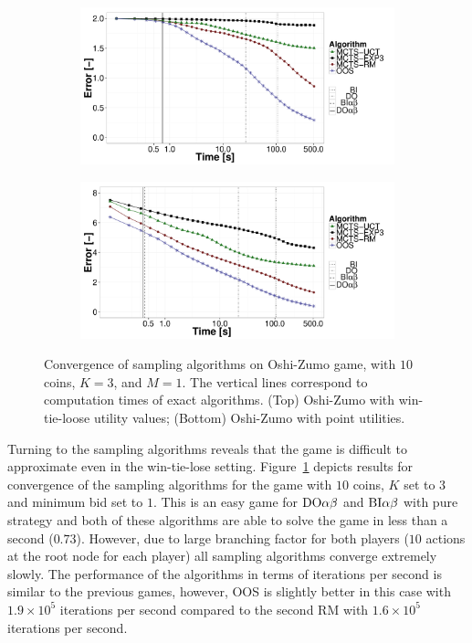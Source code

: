 \begin{figure}[t]
\centering
	\begin{subfigure}{0.85\textwidth}
		\includegraphics[width=1\textwidth]{figures/convergence-oz.pdf}
	\end{subfigure}
	\begin{subfigure}{0.85\textwidth}
		\includegraphics[width=1\textwidth]{figures/convergence-oz-bf.pdf}
	\end{subfigure}
\caption{Convergence of sampling algorithms on Oshi-Zumo game, with $10$ coins, $K=3$, and $M=1$. The vertical lines correspond to computation times of exact algorithms.
(Top) Oshi-Zumo with win-tie-loose utility values;
(Bottom) Oshi-Zumo with point utilities.} \label{fig:off:conv:oz}
\end{figure}

Turning to the sampling algorithms reveals that the game is difficult to approximate even in the win-tie-lose setting.
Figure~\ref{fig:off:conv:oz} depicts results for convergence of the sampling algorithms for the game with $10$ coins, $K$ set to $3$ and minimum bid set to $1$. This is an easy game for $\textrm{DO}\alpha\beta$ and $\textrm{BI}\alpha\beta$ with pure strategy and both of these algorithms are able to solve the game in less than a second ($0.73$). However, due to large branching factor for both players ($10$ actions at the root node for each player) all sampling algorithms converge extremely slowly. The performance of the algorithms in terms of iterations per second is similar to the previous games, however, OOS is slightly better in this case with $1.9\times10^5$ iterations per second compared to the second RM with $1.6\times10^5$ iterations per second.

